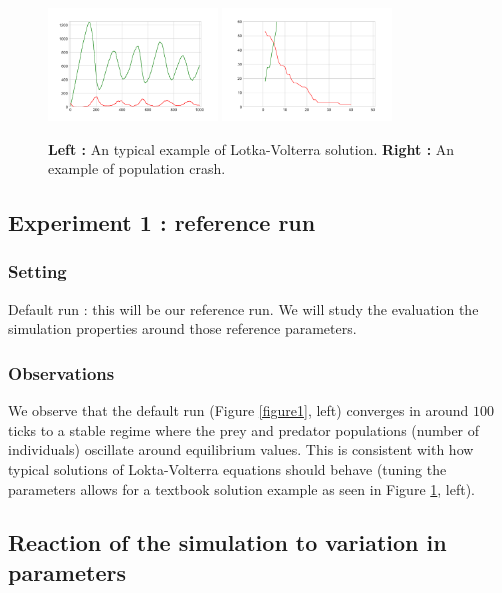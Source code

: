 \documentclass[11pt]{article}
\begin{document}
\begin{figure}[h!]
  \centering
  \includegraphics[width=0.4\textwidth]{plots/sim16.png}
  \includegraphics[width=0.4\textwidth]{plots/sim17.png}
  \caption{\textbf{Left :} An typical example of Lotka-Volterra solution. \textbf{Right :} An example of population crash. }
  \label{figure3}
\end{figure}

\subsection{Experiment 1 : reference run}

\subsubsection{Setting}

Default run : this will be our reference run. We will study the evaluation the simulation properties around those reference parameters.

\subsubsection{Observations} 

We observe that the default run (Figure \ref{figure1}, left) converges in around $100$ ticks to a stable regime where the prey and predator populations (number of individuals) oscillate around equilibrium values. This is consistent with how typical solutions of Lokta-Volterra equations should behave (tuning the parameters allows for a textbook solution example as seen in Figure \ref{figure3}, left).


\subsection{Reaction of the simulation to variation in parameters}
\end{document}
